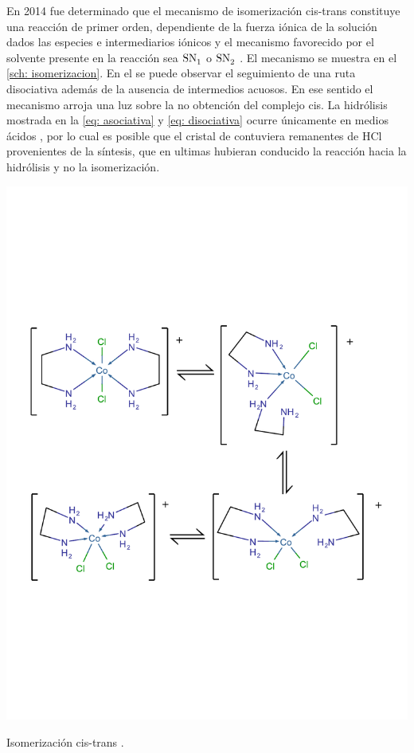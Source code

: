 \documentclass[fleqn,10pt]{SelfArx} %
\begin{document}
	En 2014 fue determinado que el mecanismo de isomerizaci\'on cis-trans constituye una reacci\'on de primer orden, dependiente de la fuerza iónica de la solución dados las especies e intermediarios iónicos y el mecanismo favorecido por el solvente presente en la reacción sea $\ce{SN_{1}}$ o $\ce{SN_{2}}$ \cite{Mechanism}. El mecanismo se muestra en el \autoref{sch: isomerizacion}. En el se puede observar el seguimiento de una ruta disociativa adem\'as de la ausencia de intermedios acuosos. En ese sentido el mecanismo arroja una luz sobre la no obtenci\'on del complejo cis. La hidr\'olisis mostrada en la \autoref{eq: asociativa} y \autoref{eq: disociativa} ocurre \'unicamente en medios \'acidos \cite{Afzal}, por lo cual es posible que el cristal de  contuviera remanentes de HCl provenientes de la s\'intesis, que en ultimas hubieran conducido la reacci\'on hacia la hidr\'olisis y no la isomerizaci\'on.
	\begin{scheme}[h]
	    \centering
	    \includegraphics[width = \linewidth]{images/Isomerization.pdf}
	    \caption{Isomerizaci\'on cis-trans \cite{Mechanism}.}
	    \label{sch: isomerizacion}
	\end{scheme}
	
\end{document}
